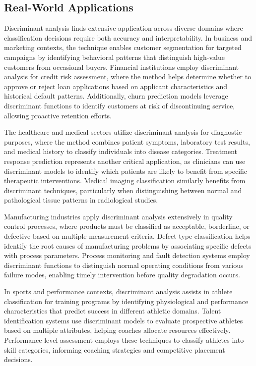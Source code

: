 \documentclass[
]{article}
\begin{document}
\subsection{Real-World Applications}

Discriminant analysis finds extensive application across diverse domains
where classification decisions require both accuracy and
interpretability. In business and marketing contexts, the technique
enables customer segmentation for targeted campaigns by identifying
behavioral patterns that distinguish high-value customers from
occasional buyers. Financial institutions employ discriminant analysis
for credit risk assessment, where the method helps determine whether to
approve or reject loan applications based on applicant characteristics
and historical default patterns. Additionally, churn prediction models
leverage discriminant functions to identify customers at risk of
discontinuing service, allowing proactive retention efforts.

The healthcare and medical sectors utilize discriminant analysis for
diagnostic purposes, where the method combines patient symptoms,
laboratory test results, and medical history to classify individuals
into disease categories. Treatment response prediction represents
another critical application, as clinicians can use discriminant models
to identify which patients are likely to benefit from specific
therapeutic interventions. Medical imaging classification similarly
benefits from discriminant techniques, particularly when distinguishing
between normal and pathological tissue patterns in radiological studies.

Manufacturing industries apply discriminant analysis extensively in
quality control processes, where products must be classified as
acceptable, borderline, or defective based on multiple measurement
criteria. Defect type classification helps identify the root causes of
manufacturing problems by associating specific defects with process
parameters. Process monitoring and fault detection systems employ
discriminant functions to distinguish normal operating conditions from
various failure modes, enabling timely intervention before quality
degradation occurs.

In sports and performance contexts, discriminant analysis assists in
athlete classification for training programs by identifying
physiological and performance characteristics that predict success in
different athletic domains. Talent identification systems use
discriminant models to evaluate prospective athletes based on multiple
attributes, helping coaches allocate resources effectively. Performance
level assessment employs these techniques to classify athletes into
skill categories, informing coaching strategies and competitive
placement decisions.
\end{document}
